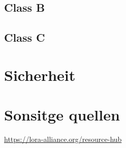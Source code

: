 \documentclass[a4paper,12pt]{article}
\begin{document}
    \subsection{Class B}
    \subsection{Class C}
    \section{Sicherheit}
        \cite{LoRaSecur}
        \cite{RFC8376}
        \cite{WhatIsLoRa}
    \section{Sonsitge quellen}
    \url{https://lora-alliance.org/resource-hub}

    \newpage
    
    
\end{document}
